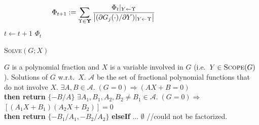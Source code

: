 \documentclass[]{article}
\begin{document}
\begin{algorithm}
\begin{algorithmic}
\begin{equation}
\label{e:core}
\hspace{-28mm}
\Phi_{t + 1} 
:=
\sum_{\Upsilon \in \boldsymbol{\Upsilon}}
\frac{{\Phi_t}|_{Y \leftarrow \Upsilon}}{
\big|(\partial G_j(\cdot) / \partial Y) |_{Y \leftarrow \Upsilon}
\big|
}
\end{equation} \vspace{-4mm}
	\STATE $t \leftarrow t + 1 $	
\ENDFOR
{} $\Phi_t$
\end{algorithmic}
\end{algorithm}
\begin{algorithm}[tb]%
\caption{\textsc{Solve}$(G; X)$    
\label{alg:solve}}
\begin{algorithmic}
\small
{} $G$ is a polynomial fraction and $X$ is a variable involved in $G$ (i.e.\ $Y \in \textsc{Scope}(G)$).
 Solutions of $G$ w.r.t.\ $X$.
 $\mathcal{A}$ be the set of fractional polynomial functions that do not involve $X$. 
{%
{} $\exists A, B \in \mathcal{A}. \; (G=0) \Rightarrow (A X + B = 0)$ 
\\\hspace{5mm}
{\bf then return} $\{-B/A\}$
 $\exists A_1, B_1, A_2, B_2 \neq B_1 \in \mathcal{A}.\; (G=0) \Rightarrow$
\\\hspace{5mm} 
$ [(A_1 X + B_1)(A_2 X + B_2)]=0$
\\\hspace{5mm} 
{\bf then return} $\{-B_1/A_1, -B_2/A_2\}$ {\bf elseIf} ...
 $\emptyset$ \hspace*{\fill} //could not be factorized. }
\end{algorithmic}
\end{algorithm}
\end{document}
